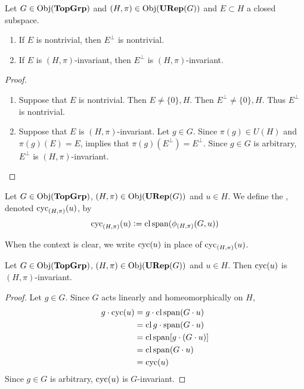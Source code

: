 \documentclass{book}
\begin{document}
	\begin{ex}
		Let $G \in \operatorname{Obj}(\operatorname*{\text{\textbf{TopGrp}}})$ and $(H, \pi) \in \operatorname{Obj}(\operatorname*{\text{\textbf{URep}}}(G))$ and $E \subset H$ a closed subspace. 
		\begin{enumerate}
			\item If $E$ is nontrivial, then $E^{\perp}$ is nontrivial.
			\item If $E$ is $(H, \pi)$-invariant, then $E^{\perp}$ is  $(H, \pi)$-invariant.  
		\end{enumerate}
	\end{ex}
	
	\begin{proof}\
		\begin{enumerate}
			\item Suppose that $E$ is nontrivial. Then $E \neq \{0\}, H$. Then $E^{\perp} \neq \{0\}, H$. Thus $E^{\perp}$ is nontrivial.
			\item Suppose that $E$ is $(H, \pi)$-invariant. Let $g \in G$. Since $\pi(g) \in U(H)$ and $\pi(g)(E) = E$,  implies that $\pi(g)(E^{\perp}) = E^{\perp}$. Since $g \in G$ is arbitrary, $E^{\perp}$ is $(H, \pi)$-invariant. 
		\end{enumerate}
	\end{proof}

	\begin{defn}
		Let $G \in \operatorname{Obj}(\operatorname*{\text{\textbf{TopGrp}}})$, $(H, \pi) \in \operatorname{Obj}(\operatorname*{\text{\textbf{URep}}}(G))$ and $u \in H$. We define the , denoted $\operatorname{cyc}_{(H, \pi)}(u)$, by 
		$$\operatorname{cyc}_{(H, \pi)}(u) \vcentcolon= \operatorname{cl} \operatorname{span} (\phi_{(H, \pi)}(G, u))$$
	\end{defn}

	\begin{note}
		When the context is clear, we write $\operatorname{cyc}(u)$ in place of $\operatorname{cyc}_{(H, \pi)}(u)$.
	\end{note}
	
	\begin{ex}
		Let $G \in \operatorname{Obj}(\operatorname*{\text{\textbf{TopGrp}}})$, $(H, \pi) \in \operatorname{Obj}(\operatorname*{\text{\textbf{URep}}}(G))$ and $u \in H$. Then $\operatorname{cyc}(u)$ is $(H, \pi)$-invariant. 
	\end{ex}
	
	\begin{proof}
		Let $g \in G$. Since $G$ acts linearly and homeomorphically on $H$, 
		\begin{align*}
			g \cdot \operatorname{cyc}(u) 
			& = g \cdot \operatorname{cl} \operatorname{span} (G \cdot u) \\
			& = \operatorname{cl} g \cdot \operatorname{span} (G \cdot u) \\
			& = \operatorname{cl} \operatorname{span} [g \cdot (G \cdot u)] \\
			& = \operatorname{cl} \operatorname{span} (G \cdot u) \\
			& = \operatorname{cyc}(u)
		\end{align*}
		Since $g \in G$ is arbitrary, $\operatorname{cyc}(u)$ is $G$-invariant. 
	\end{proof}
	
\end{document}
